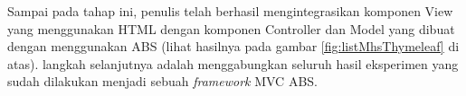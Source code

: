 Sampai pada tahap ini, penulis telah berhasil mengintegrasikan komponen View yang menggunakan HTML dengan komponen Controller dan Model yang dibuat dengan menggunakan ABS (lihat hasilnya pada gambar \ref{fig:listMhsThymeleaf} di atas). langkah selanjutnya adalah menggabungkan seluruh hasil eksperimen yang sudah dilakukan menjadi sebuah \textit{framework} MVC ABS.